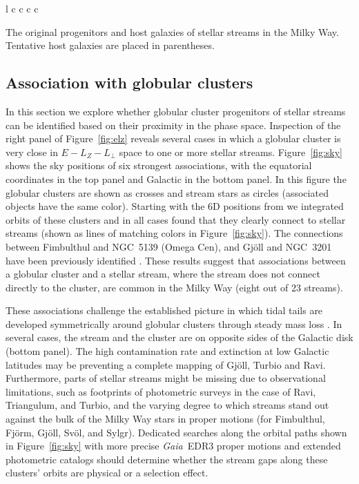 \documentclass[twocolumn]{aastex63}
\newcommand{\gaia}{\textsl{Gaia}}
\newcommand{\feh}{\ensuremath{\textrm{[Fe/H]}}}
\begin{document}
\begin{deluxetable}{l c c c c}
\tablehead{
Name & Host Galaxy & Progenitor & Type & \feh
}
\decimals
\startdata

\enddata
\caption{
The original progenitors and host galaxies of stellar streams in the Milky Way.
Tentative host galaxies are placed in parentheses.
}
\label{table}
\end{deluxetable}


\subsection{Association with globular clusters}
\label{sec:progenitors}
In this section we explore whether globular cluster progenitors of stellar streams can be identified based on their proximity in the phase space.
Inspection of the right panel of Figure~\ref{fig:elz} reveals several cases in which a globular cluster is very close in $E-L_Z-L_\perp$ space to one or more stellar streams.
Figure~\ref{fig:sky} shows the sky positions of six strongest associations, with the equatorial coordinates in the top panel and Galactic in the bottom panel.
In this figure the globular clusters are shown as crosses and stream stars as circles (associated objects have the same color).
Starting with the 6D positions from \citet{baumgardt2019} we integrated orbits of these clusters and in all cases found that they clearly connect to stellar streams (shown as lines of matching colors in Figure~\ref{fig:sky}).
The connections between Fimbulthul and NGC~5139 (Omega Cen), and Gj\" oll and NGC~3201 have been previously identified \citep[respectively]{ibata2019b, hansen2020}.
These results suggest that associations between a globular cluster and a stellar stream, where the stream does not connect directly to the cluster, are common in the Milky Way (eight out of 23 streams).

These associations challenge the established picture in which tidal tails are developed symmetrically around globular clusters through steady mass loss \citep[e.g.,][]{kuepper2010}.
In several cases, the stream and the cluster are on opposite sides of the Galactic disk (bottom panel).
The high contamination rate and extinction at low Galactic latitudes may be preventing a complete mapping of Gj\" oll, Turbio and Ravi.
Furthermore, parts of stellar streams might be missing due to observational limitations, such as footprints of photometric surveys in the case of Ravi, Triangulum, and Turbio, and the varying degree to which streams stand out against the bulk of the Milky Way stars in proper motions (for Fimbulthul, Fj\" orm, Gj\" oll, Sv\" ol, and Sylgr).
Dedicated searches along the orbital paths shown in Figure~\ref{fig:sky} with more precise \gaia\ EDR3 proper motions \citep{edr3} and extended photometric catalogs \citep{decals} should determine whether the stream gaps along these clusters' orbits are physical or a selection effect.
\end{document}
